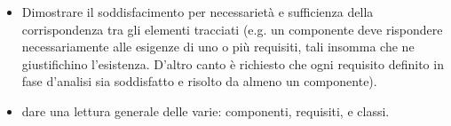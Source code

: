 \begin{itemize}
	\item Dimostrare il soddisfacimento per necessarietà e sufficienza della corrispondenza tra gli elementi tracciati (e.g. un componente deve rispondere necessariamente alle esigenze di uno o più requisiti, tali insomma che ne giustifichino l'esistenza. D'altro canto è richiesto che ogni requisito definito in fase d'analisi sia soddisfatto e risolto da almeno un componente).
	\item dare una lettura generale delle varie: componenti, requisiti,  e classi.
\end{itemize}




